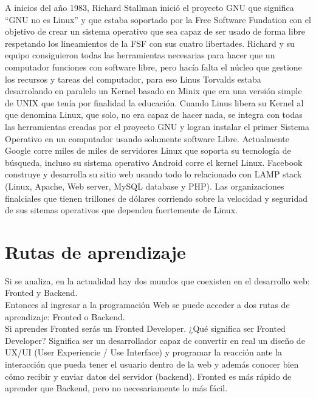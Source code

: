 \documentclass[twocolumns,a4paper]{IEEEtran}
\begin{document}
A inicios del año 1983, Richard Stallman inició el proyecto GNU que significa
``GNU no es Linux'' y que estaba soportado por la Free Software Fundation con
el objetivo de crear un sistema operativo que sea capaz de ser usado de forma
libre respetando los lineamientos de la FSF con sus cuatro libertades. Richard
y su equipo consiguieron todas las herramientas necesarias para hacer que un
computador funciones con software libre, pero hacía falta el núcleo que
gestione los recursos y tareas del computador, para eso Linus Torvalds estaba
desarrolando en paralelo un Kernel basado en Minix que era una versión simple
de UNIX que tenía por finalidad la educación. Cuando Linus libera su Kernel al
que denomina Linux, que solo, no era capaz de hacer nada, se integra con todas
las herramientas creadas por el proyecto GNU y logran instalar el primer
Sistema Operativo en un computador usando solamente software Libre.
Actualmente Google corre miles de miles de servidores Linux que soporta su
tecnología de búsqueda, incluso su sistema operativo Android corre el kernel
Linux. Facebook construye y desarrolla su sitio web usando todo lo relacionado
con LAMP stack (Linux, Apache, Web server, MySQL database y PHP). Las
organizaciones finalciales que tienen trillones de dólares corriendo sobre la
velocidad y seguridad de sus sitemas operativos que dependen fuertemente de
Linux\cite{ChrisNegusLinux2005}.
\newline

\section{Rutas de aprendizaje}
Si se analiza, en la actualidad hay dos mundos que coexisten en el desarrollo
web: Fronted y Backend.\\
Entonces al ingresar a la programación Web se puede acceder a dos rutas de
aprendizaje: Fronted o Backend.\\

Si aprendes Fronted serás un Fronted Developer. 
¿Qué significa ser Fronted Developer? Significa ser un desarrollador capaz de
convertir en real un diseño de UX/UI (User Experiencie / Use Interface) y
programar la reacción ante la interacción que pueda tener el usuario dentro de
la web y además conocer bien cómo recibir y enviar datos del servidor
(backend). Fronted es más rápido de aprender que Backend, pero no
necesariamente lo más fácil.\\
\end{document}
